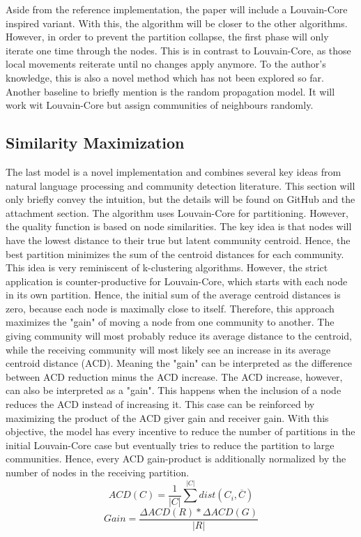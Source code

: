 \documentclass[11pt, twocolumn]{article}
\begin{document}
Aside from the reference implementation, the paper will include a Louvain-Core inspired variant. With this, the algorithm will be closer to the other algorithms. However, in order to prevent the partition collapse, the first phase will only iterate one time through the nodes. This is in contrast to Louvain-Core, as those local movements reiterate until no changes apply anymore. To the author's knowledge, this is also a novel method which has not been explored so far. Another baseline to briefly mention is the random propagation model. It will work wit Louvain-Core but assign communities of neighbours randomly.

\subsection{Similarity Maximization}
The last model is a novel implementation and combines several key ideas from natural language processing and community detection literature. This section will only briefly convey the intuition, but the details will be found on GitHub and the attachment section. The algorithm uses Louvain-Core for partitioning. However, the quality function is based on node similarities. The key idea is that nodes will have the lowest distance to their true but latent community centroid. Hence, the best partition minimizes the sum of the centroid distances for each community. This idea is very reminiscent of k-clustering algorithms. However, the strict application is counter-productive for Louvain-Core, which starts with each node in its own partition. Hence, the initial sum of the average centroid distances is zero, because each node is maximally close to itself. Therefore, this approach maximizes the "gain" of moving a node from one community to another. The giving community will most probably reduce its average distance to the centroid, while the receiving community will most likely see an increase in its average centroid distance (ACD). Meaning the "gain" can be interpreted as the difference between ACD reduction minus the ACD increase. The ACD increase, however, can also be interpreted as a "gain". This happens when the inclusion of a node reduces the ACD instead of increasing it. This case can be reinforced by maximizing the product of the ACD giver gain and receiver gain. With this objective, the model has every incentive to reduce the number of partitions in the initial Louvain-Core case but eventually tries to reduce the partition to large communities. Hence, every ACD gain-product is additionally normalized by the number of nodes in the receiving partition.
\begin{equation}
    ACD(C)= \frac{1}{|C|} \sum^{|C|}dist(C_i, \overline{C})
\end{equation}
\begin{equation}
    Gain = \frac{\Delta ACD(R)*\Delta ACD(G)}{|R|}
\end{equation}
\end{document}
